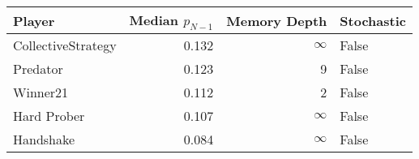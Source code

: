\begin{tabular}{lrrl}
\toprule
             Player &  Median $p_{N-1}$ &  Memory Depth & Stochastic \\
\midrule
 CollectiveStrategy &             0.132 &            \(\infty\) &      False \\
           Predator &             0.123 &             9 &      False \\
           Winner21 &             0.112 &             2 &      False \\
        Hard Prober &             0.107 &            \(\infty\) &      False \\
          Handshake &             0.084 &            \(\infty\) &      False \\
\bottomrule
\end{tabular}
